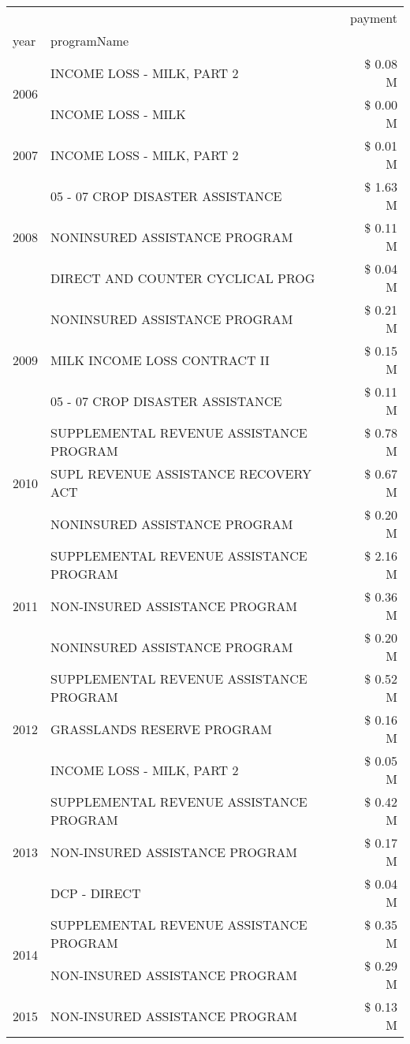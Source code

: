 \begin{tabular}{llr}
\toprule
 &  & payment \\
year & programName &  \\
\midrule
\multirow[t]{2}{*}{2006} & INCOME LOSS - MILK, PART 2 & \$ 0.08 M \\
 & INCOME LOSS - MILK & \$ 0.00 M \\
\cline{1-3}
2007 & INCOME LOSS - MILK, PART 2 & \$ 0.01 M \\
\cline{1-3}
\multirow[t]{3}{*}{2008} & 05 - 07 CROP DISASTER ASSISTANCE & \$ 1.63 M \\
 & NONINSURED ASSISTANCE PROGRAM & \$ 0.11 M \\
 & DIRECT AND COUNTER CYCLICAL PROG & \$ 0.04 M \\
\cline{1-3}
\multirow[t]{3}{*}{2009} & NONINSURED ASSISTANCE PROGRAM & \$ 0.21 M \\
 & MILK INCOME LOSS CONTRACT II & \$ 0.15 M \\
 & 05 - 07 CROP DISASTER ASSISTANCE & \$ 0.11 M \\
\cline{1-3}
\multirow[t]{3}{*}{2010} & SUPPLEMENTAL REVENUE ASSISTANCE PROGRAM & \$ 0.78 M \\
 & SUPL REVENUE ASSISTANCE RECOVERY ACT & \$ 0.67 M \\
 & NONINSURED ASSISTANCE PROGRAM & \$ 0.20 M \\
\cline{1-3}
\multirow[t]{3}{*}{2011} & SUPPLEMENTAL REVENUE ASSISTANCE PROGRAM & \$ 2.16 M \\
 & NON-INSURED ASSISTANCE PROGRAM & \$ 0.36 M \\
 & NONINSURED ASSISTANCE PROGRAM & \$ 0.20 M \\
\cline{1-3}
\multirow[t]{3}{*}{2012} & SUPPLEMENTAL REVENUE ASSISTANCE PROGRAM & \$ 0.52 M \\
 & GRASSLANDS RESERVE PROGRAM & \$ 0.16 M \\
 & INCOME LOSS - MILK, PART 2 & \$ 0.05 M \\
\cline{1-3}
\multirow[t]{3}{*}{2013} & SUPPLEMENTAL REVENUE ASSISTANCE PROGRAM & \$ 0.42 M \\
 & NON-INSURED ASSISTANCE PROGRAM & \$ 0.17 M \\
 & DCP - DIRECT & \$ 0.04 M \\
\cline{1-3}
\multirow[t]{2}{*}{2014} & SUPPLEMENTAL REVENUE ASSISTANCE PROGRAM & \$ 0.35 M \\
 & NON-INSURED ASSISTANCE PROGRAM & \$ 0.29 M \\
\cline{1-3}
\multirow[t]{3}{*}{2015} & NON-INSURED ASSISTANCE PROGRAM & \$ 0.13 M \\

\end{tabular}
